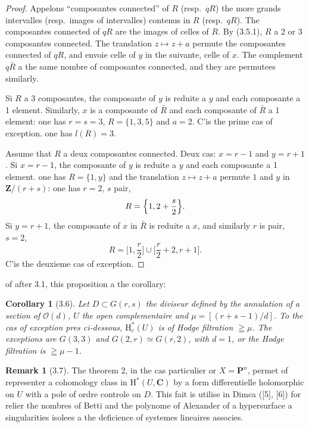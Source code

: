 \documentclass[12pt,a4paper]{article}
\theoremstyle{plain}
\newtheorem{corollary}[theorem]{Corollary}
\theoremstyle{definition}
\newtheorem{remark}[theorem]{Remark}
\begin{document}
\begin{proof}[Proof]
Appelons ``composantes connected'' of $R$ (resp.\ $qR$) the more grands intervalles (resp.\ images of intervalles) contenus in $R$ (resp.\ $qR$). The composantes connected of $qR$ are the images of celles of $R$. By (3.5.1), $R$ a 2 or 3 composantes connected. The translation $z \mapsto z+a$ permute the composantes connected of $qR$, and envoie celle of $y$ in the suivante, celle of $x$. The complement $q\bar{R}$ a the same nombre of composantes connected, and they are permutees similarly.

Si $R$ a 3 composantes, the composante of $y$ is reduite a $y$ and each composante a 1 element. Similarly, $x$ is a composante of $\bar{R}$ and each composante of $\bar{R}$ a 1 element: one has $r = s = 3$, $R = \{1, 3, 5\}$ and $a = 2$. C'is the prime cas of exception. one has $l(R) = 3$.

Assume that $R$ a deux composantes connected. Deux cas: $x = r-1$ and $y = r+1$. Si $x = r-1$, the composante of $y$ is reduite a $y$ and each composante a 1 element. one has $R = \{1, y\}$ and the translation $z \mapsto z+a$ permute $1$ and $y$ in $\mathbf{Z}/(r+s)$: one has $r = 2$, $s$ pair,
\[
R = \Bigl\{1, 2 + \frac{s}{2}\Bigr\}.
\]
Si $y = r+1$, the composante of $x$ in $\bar{R}$ is reduite a $x$, and similarly $r$ is pair, $s = 2$,
\[
R = \biggl[1, \frac{r}{2}\biggr] \cup \biggl[\frac{r}{2} + 2, r+1\biggr].
\]
C'is the deuxieme cas of exception.
\end{proof}

of after 3.1, this proposition a the corollary:

\begin{corollary}[3.6]
Let $D \subset G(r, s)$ the diviseur defined by the annulation of a section of $\mathscr{O}(d)$, $U$ the open complementaire and $\mu = [(r+s-1)/d]$. To the cas of exception pres ci-dessous, $\mathrm{H}_c^*(U)$ is of Hodge filtration $\geqq \mu$. The exceptions are $G(3, 3)$ and $G(2, r) \simeq G(r, 2)$, with $d = 1$, or the Hodge filtration is $\geqq \mu - 1$.
\end{corollary}

\begin{remark}[3.7]
The theorem 2, in the cas particulier or $X = \mathbf{P}^n$, permet of representer a cohomology class in $\mathrm{H}^*(U, \mathbf{C})$ by a form differentielle holomorphic on $U$ with a pole of ordre controle on $D$. This fait is utilise in Dimca ([5], [6]) for relier the nombres of Betti and the polynome of Alexander of a hypersurface a singularities isolees a the deficience of systemes lineaires associes.
\end{remark}
\end{document}
